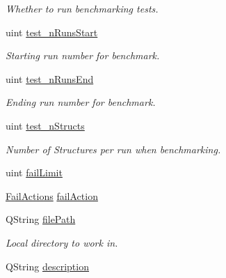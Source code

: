 \begin{DoxyCompactItemize}
\begin{DoxyCompactList}\small\item\em Whether to run benchmarking tests. \end{DoxyCompactList}\item 
\hypertarget{classGlobalSearch_1_1OptBase_a8d8902d09ca98a8f078182394bd1d7a1}{}uint \hyperlink{classGlobalSearch_1_1OptBase_a8d8902d09ca98a8f078182394bd1d7a1}{test\+\_\+n\+Runs\+Start}\label{classGlobalSearch_1_1OptBase_a8d8902d09ca98a8f078182394bd1d7a1}

\begin{DoxyCompactList}\small\item\em Starting run number for benchmark. \end{DoxyCompactList}\item 
\hypertarget{classGlobalSearch_1_1OptBase_a3433cbd854cbbb5d350e2ba7bb665c44}{}uint \hyperlink{classGlobalSearch_1_1OptBase_a3433cbd854cbbb5d350e2ba7bb665c44}{test\+\_\+n\+Runs\+End}\label{classGlobalSearch_1_1OptBase_a3433cbd854cbbb5d350e2ba7bb665c44}

\begin{DoxyCompactList}\small\item\em Ending run number for benchmark. \end{DoxyCompactList}\item 
\hypertarget{classGlobalSearch_1_1OptBase_a973157ab02d197102e5f67d80aacd706}{}uint \hyperlink{classGlobalSearch_1_1OptBase_a973157ab02d197102e5f67d80aacd706}{test\+\_\+n\+Structs}\label{classGlobalSearch_1_1OptBase_a973157ab02d197102e5f67d80aacd706}

\begin{DoxyCompactList}\small\item\em Number of Structures per run when benchmarking. \end{DoxyCompactList}\item 
uint \hyperlink{classGlobalSearch_1_1OptBase_aec8bb712a35c23ab79608a5d70f52b90}{fail\+Limit}
\item 
\hyperlink{classGlobalSearch_1_1OptBase_a970b328cd0a36335c34c6b24c6ac2775}{Fail\+Actions} \hyperlink{classGlobalSearch_1_1OptBase_adda17a1eab956c00c6b14ab3ae451b91}{fail\+Action}
\item 
\hypertarget{classGlobalSearch_1_1OptBase_a707d2bf2511d4fec3f244afb2f094c6e}{}Q\+String \hyperlink{classGlobalSearch_1_1OptBase_a707d2bf2511d4fec3f244afb2f094c6e}{file\+Path}\label{classGlobalSearch_1_1OptBase_a707d2bf2511d4fec3f244afb2f094c6e}

\begin{DoxyCompactList}\small\item\em Local directory to work in. \end{DoxyCompactList}\item 
\hypertarget{classGlobalSearch_1_1OptBase_ae7a73ff186f939f8fab1647a2dea6872}{}Q\+String \hyperlink{classGlobalSearch_1_1OptBase_ae7a73ff186f939f8fab1647a2dea6872}{description}\label{classGlobalSearch_1_1OptBase_ae7a73ff186f939f8fab1647a2dea6872}


\end{DoxyCompactItemize}
